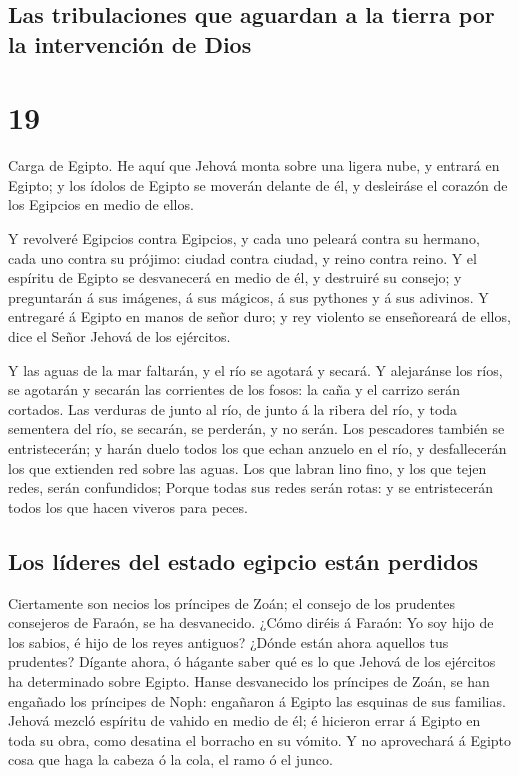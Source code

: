 \hypertarget{las-tribulaciones-que-aguardan-a-la-tierra-por-la-intervenciuxf3n-de-dios}{%
\subsection{Las tribulaciones que aguardan a la tierra por la
intervención de
Dios}\label{las-tribulaciones-que-aguardan-a-la-tierra-por-la-intervenciuxf3n-de-dios}}

\hypertarget{section-18}{%
\section{19}\label{section-18}}

 Carga de Egipto. He aquí que Jehová monta sobre una ligera
nube, y entrará en Egipto; y los ídolos de Egipto se moverán delante de
él, y desleiráse el corazón de los Egipcios en medio de ellos.

 Y revolveré Egipcios contra Egipcios, y cada uno peleará
contra su hermano, cada uno contra su prójimo: ciudad contra ciudad, y
reino contra reino.  Y el espíritu de Egipto se desvanecerá
en medio de él, y destruiré su consejo; y preguntarán á sus imágenes, á
sus mágicos, á sus pythones y á sus adivinos.  Y entregaré á
Egipto en manos de señor duro; y rey violento se enseñoreará de ellos,
dice el Señor Jehová de los ejércitos.

 Y las aguas de la mar faltarán, y el río se agotará y
secará.  Y alejaránse los ríos, se agotarán y secarán las
corrientes de los fosos: la caña y el carrizo serán cortados.
 Las verduras de junto al río, de junto á la ribera del río,
y toda sementera del río, se secarán, se perderán, y no serán.
 Los pescadores también se entristecerán; y harán duelo
todos los que echan anzuelo en el río, y desfallecerán los que extienden
red sobre las aguas.  Los que labran lino fino, y los que
tejen redes, serán confundidos;  Porque todas sus redes
serán rotas: y se entristecerán todos los que hacen viveros para peces.

\hypertarget{los-luxedderes-del-estado-egipcio-estuxe1n-perdidos}{%
\subsection{Los líderes del estado egipcio están
perdidos}\label{los-luxedderes-del-estado-egipcio-estuxe1n-perdidos}}

 Ciertamente son necios los príncipes de Zoán; el consejo
de los prudentes consejeros de Faraón, se ha desvanecido. ¿Cómo diréis á
Faraón: Yo soy hijo de los sabios, é hijo de los reyes antiguos?
 ¿Dónde están ahora aquellos tus prudentes? Dígante ahora,
ó hágante saber qué es lo que Jehová de los ejércitos ha determinado
sobre Egipto.  Hanse desvanecido los príncipes de Zoán, se
han engañado los príncipes de Noph: engañaron á Egipto las esquinas de
sus familias.  Jehová mezcló espíritu de vahido en medio de
él; é hicieron errar á Egipto en toda su obra, como desatina el borracho
en su vómito.  Y no aprovechará á Egipto cosa que haga la
cabeza ó la cola, el ramo ó el junco.

